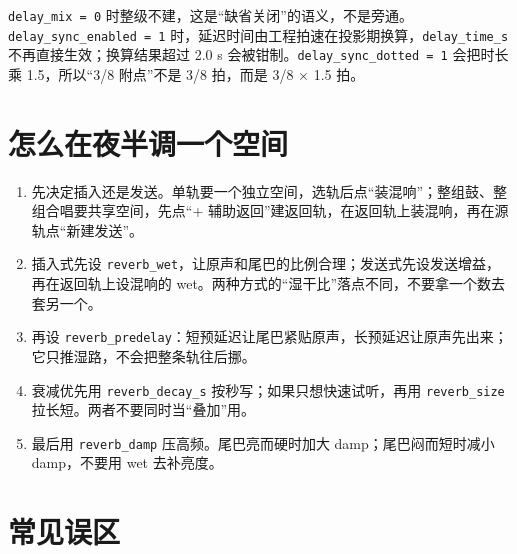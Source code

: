\texttt{delay\_mix = 0} 时整级不建，这是“缺省关闭”的语义，不是旁通。\texttt{delay\_sync\_enabled = 1} 时，延迟时间由工程拍速在投影期换算，\texttt{delay\_time\_s} 不再直接生效；换算结果超过 2.0 s 会被钳制。\texttt{delay\_sync\_dotted = 1} 会把时长乘 1.5，所以“3/8 附点”不是 3/8 拍，而是 3/8 × 1.5 拍。

\section{怎么在夜半调一个空间}

\begin{enumerate}
  \item 先决定插入还是发送。单轨要一个独立空间，选轨后点“装混响”；整组鼓、整组合唱要共享空间，先点“+ 辅助返回”建返回轨，在返回轨上装混响，再在源轨点“新建发送”。
  \item 插入式先设 \texttt{reverb\_wet}，让原声和尾巴的比例合理；发送式先设发送增益，再在返回轨上设混响的 wet。两种方式的“湿干比”落点不同，不要拿一个数去套另一个。
  \item 再设 \texttt{reverb\_predelay}：短预延迟让尾巴紧贴原声，长预延迟让原声先出来；它只推湿路，不会把整条轨往后挪。
  \item 衰减优先用 \texttt{reverb\_decay\_s} 按秒写；如果只想快速试听，再用 \texttt{reverb\_size} 拉长短。两者不要同时当“叠加”用。
  \item 最后用 \texttt{reverb\_damp} 压高频。尾巴亮而硬时加大 damp；尾巴闷而短时减小 damp，不要用 wet 去补亮度。
\end{enumerate}



\section{常见误区}

